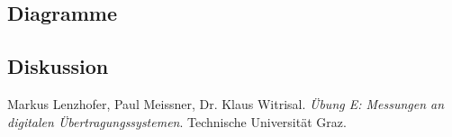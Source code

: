 \documentclass[12pt,a4paper,ngerman]{article}
\begin{document}
\subsection{Diagramme}

\subsection{Diskussion}

\begin{thebibliography}{9}

  Markus Lenzhofer, Paul Meissner, Dr. Klaus Witrisal.
  \emph{Übung E: Messungen an digitalen Übertragungssystemen}.
  Technische Universität Graz.

\end{thebibliography}


 



   
\end{document}
